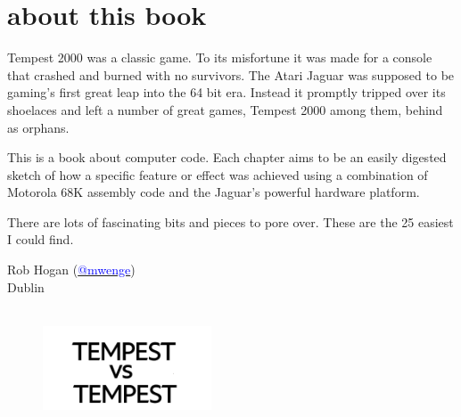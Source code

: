 \chapter*{about this book} 
Tempest 2000 was a classic game. To its misfortune it was made for a console that crashed and burned with no
survivors. The Atari Jaguar was supposed to be gaming's first great leap into the 64 bit era. Instead it 
promptly tripped over its shoelaces and left a number of great games, Tempest 2000 among them, behind
as orphans.

This is a book about computer code. Each chapter aims to be an easily digested sketch of how
a specific feature or effect was achieved using a combination of Motorola 68K assembly code and
the Jaguar's powerful hardware platform.

There are lots of fascinating bits and pieces to pore over. These are the 25 easiest I could find.


Rob Hogan (\href{https://mastodon.social/@mwenge}{\textcolor{blue}{@mwenge}})\\
Dublin \the\year{} \\

\clearpage
\newpage
\ %
\newpage
\vspace*{\fill}
\begin{figure}[H]
    \centering
      \includegraphics[width=5cm]{src/cover/title_page.png}%
\end{figure}
\vspace*{\fill}
\thispagestyle{empty}%
\clearpage

